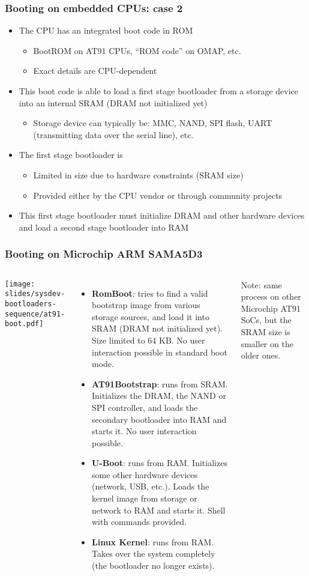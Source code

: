\begin{frame}
  \frametitle{Booting on embedded CPUs: case 2}
  \begin{itemize}
  \item The CPU has an integrated boot code in ROM
    \begin{itemize}
    \item BootROM on AT91 CPUs, “ROM code” on OMAP, etc.
    \item Exact details are CPU-dependent
    \end{itemize}
  \item This boot code is able to load a first stage bootloader from a
    storage device into an internal SRAM (DRAM not initialized yet)
    \begin{itemize}
    \item Storage device can typically be: MMC, NAND, SPI flash, UART
          (transmitting data over the serial line), etc.
    \end{itemize}
  \item The first stage bootloader is
    \begin{itemize}
    \item Limited in size due to hardware constraints (SRAM size)
    \item Provided either by the CPU vendor or through community projects
    \end{itemize}
  \item This first stage bootloader must initialize DRAM and other
    hardware devices and load a second stage bootloader into RAM
  \end{itemize}
\end{frame}

\begin{frame}
  \frametitle{Booting on Microchip ARM SAMA5D3}
  \begin{columns}
    \texttt{[image: slides/sysdev-bootloaders-sequence/at91-boot.pdf]}
    \footnotesize
    \begin{itemize}
    \item {\bf RomBoot}: tries to find a valid bootstrap image from
      various storage sources, and load it into SRAM (DRAM not
      initialized yet). Size limited to 64 KB. No user interaction
      possible in standard boot mode.
    \item {\bf AT91Bootstrap}: runs from SRAM. Initializes the DRAM,
      the NAND or SPI controller, and loads the secondary bootloader
      into RAM and starts it. No user interaction possible.
    \item {\bf U-Boot}: runs from RAM. Initializes some other hardware
      devices (network, USB, etc.).  Loads the kernel image from
      storage or network to RAM and starts it. Shell with commands
      provided.
    \item {\bf Linux Kernel}: runs from RAM. Takes over the system
      completely (the bootloader no longer exists).
    \end{itemize}
    Note: same process on other Microchip AT91 SoCs, but the
    SRAM size is smaller on the older ones.
  \end{columns}
\end{frame}

